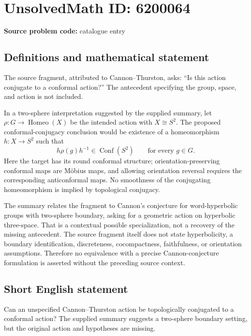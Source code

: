 \documentclass[11pt]{article}
\begin{document}
\section*{UnsolvedMath ID: 6200064}
\textbf{Source problem code:} catalogue entry
\subsection{Definitions and mathematical statement}
The source fragment, attributed to Cannon--Thurston, asks: ``Is this action conjugate to a conformal action?'' The antecedent specifying the group, space, and action is not included.

In a two-sphere interpretation suggested by the supplied summary, let $\rho:G\to\operatorname{Homeo}(X)$ be the intended action with $X\cong S^2$. The proposed conformal-conjugacy conclusion would be existence of a homeomorphism $h:X\to S^2$ such that
\[
h\rho(g)h^{-1}\in\operatorname{Conf}(S^2)\qquad\text{for every }g\in G.
\]
Here the target has its round conformal structure; orientation-preserving conformal maps are M\"obius maps, and allowing orientation reversal requires the corresponding anticonformal maps. No smoothness of the conjugating homeomorphism is implied by topological conjugacy.

The summary relates the fragment to Cannon's conjecture for word-hyperbolic groups with two-sphere boundary, asking for a geometric action on hyperbolic three-space. That is a contextual possible specialization, not a recovery of the missing antecedent. The source fragment itself does not state hyperbolicity, a boundary identification, discreteness, cocompactness, faithfulness, or orientation assumptions. Therefore no equivalence with a precise Cannon-conjecture formulation is asserted without the preceding source context.
\subsection{Short English statement}
Can an unspecified Cannon--Thurston action be topologically conjugated to a conformal action? The supplied summary suggests a two-sphere boundary setting, but the original action and hypotheses are missing.
\end{document}
